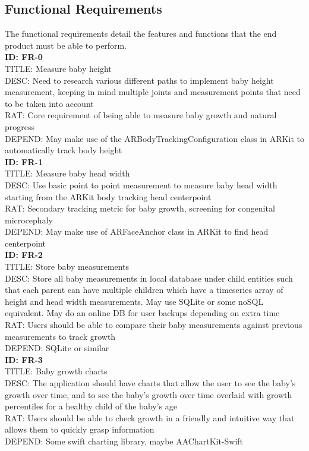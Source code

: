 \documentclass[letterpaper,10pt,draftclsnofoot,onecolumn,compsoc]{IEEEtran}
\begin{document}
\subsection{Functional Requirements}
\begin{singlespace}
\noindent
The functional requirements detail the features and functions that the end product must be able to perform.\\

\textbf{ID: FR-0}\\
TITLE: Measure baby height\\
DESC: Need to research various different paths to implement baby height measurement, keeping in mind multiple joints and measurement points that need to be taken into account\\
RAT: Core requirement of being able to measure baby growth and natural progress\\
DEPEND: May make use of the ARBodyTrackingConfiguration class in ARKit to automatically track body height\\

\textbf{ID: FR-1}\\
TITLE: Measure baby head width\\
DESC: Use basic point to point measurement to measure baby head width starting from the ARKit body tracking head centerpoint\\
RAT: Secondary tracking metric for baby growth, screening for congenital microcephaly\\
DEPEND: May make use of ARFaceAnchor class in ARKit to find head centerpoint\\

\textbf{ID: FR-2}\\
TITLE: Store baby measurements\\
DESC: Store all baby measurements in local database under child entities such that each parent can have multiple children which have a timeseries array of height and head width measurements. May use SQLite or some noSQL equivalent. May do an online DB for user backups depending on extra time\\
RAT: Users should be able to compare their baby measurements against previous measurements to track growth\\
DEPEND: SQLite or similar\\

\textbf{ID: FR-3}\\
TITLE: Baby growth charts\\
DESC: The application should have charts that allow the user to see the baby's growth over time, and to see the baby's growth over time overlaid with growth percentiles for a healthy child of the baby's age\\
RAT: Users should be able to check growth in a friendly and intuitive way that allows them to quickly grasp information\\
DEPEND: Some swift charting library, maybe AAChartKit-Swift\\


\end{singlespace}
\end{document}
